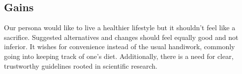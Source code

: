 \subsection{Gains}
Our persona would like to live a healthier lifestyle but it shouldn’t feel like a sacrifice. Suggested alternatives and changes should feel equally good and not inferior. It wishes for convenience instead of the usual handiwork, commonly going into keeping track of one's diet. Additionally, there is a need for clear, trustworthy guidelines rooted in scientific research.
